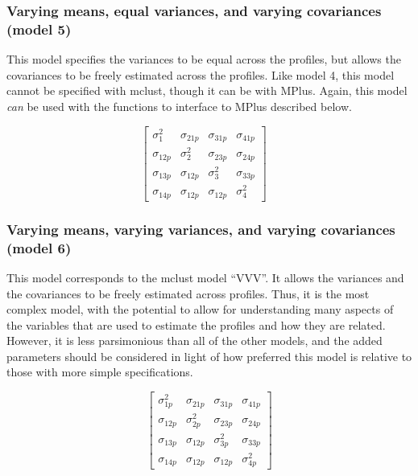 \documentclass[]{book}
\theoremstyle{definition}
\theoremstyle{definition}
\theoremstyle{definition}
\theoremstyle{remark}
\begin{document}
\subsubsection{Varying means, equal variances, and varying covariances
(model
5)}\label{varying-means-equal-variances-and-varying-covariances-model-5}

This model specifies the variances to be equal across the profiles, but
allows the covariances to be freely estimated across the profiles. Like
model 4, this model cannot be specified with mclust, though it can be
with MPlus. Again, this model \emph{can} be used with the functions to
interface to MPlus described below.

\[
\left[ \begin{matrix} { \sigma  }_{ 1 }^{ 2 } & { \sigma  }_{ 21p } & { \sigma  }_{ 31p } & { \sigma  }_{ 41p } \\ { \sigma  }_{ 12p } & { \sigma  }_{ 2 }^{ 2 } & { \sigma  }_{ 23p } & { \sigma  }_{ 24p } \\ { \sigma  }_{ 13p } & { \sigma  }_{ 12p } & { \sigma  }_{ 3 }^{ 2 } & { \sigma  }_{ 33p } \\ { \sigma  }_{ 14p } & { \sigma  }_{ 12p } & { \sigma  }_{ 12p } & { \sigma  }_{ 4 }^{ 2 } \end{matrix} \right] \quad 
\]

\subsubsection{Varying means, varying variances, and varying covariances
(model
6)}\label{varying-means-varying-variances-and-varying-covariances-model-6}

This model corresponds to the mclust model ``VVV''. It allows the
variances and the covariances to be freely estimated across profiles.
Thus, it is the most complex model, with the potential to allow for
understanding many aspects of the variables that are used to estimate
the profiles and how they are related. However, it is less parsimonious
than all of the other models, and the added parameters should be
considered in light of how preferred this model is relative to those
with more simple specifications.

\[
\left[ \begin{matrix} { \sigma  }_{ 1p }^{ 2 } & { \sigma  }_{ 21p } & { \sigma  }_{ 31p } & { \sigma  }_{ 41p } \\ { \sigma  }_{ 12p } & { \sigma  }_{ 2p }^{ 2 } & { \sigma  }_{ 23p } & { \sigma  }_{ 24p } \\ { \sigma  }_{ 13p } & { \sigma  }_{ 12p } & { \sigma  }_{ 3p }^{ 2 } & { \sigma  }_{ 33p } \\ { \sigma  }_{ 14p } & { \sigma  }_{ 12p } & { \sigma  }_{ 12p } & { \sigma  }_{ 4p }^{ 2 } \end{matrix} \right] 
\]
\end{document}
